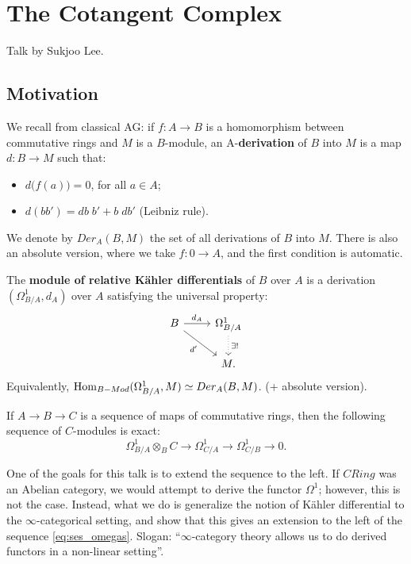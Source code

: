 \chapter{The Cotangent Complex}
Talk by Sukjoo Lee.

\section{Motivation}
\label{sect:cc_motivation}

We recall from classical AG: if $f:A \to B$ is a homomorphism between commutative rings and $M$ is a $B$-module, 
an A-\textbf{derivation} of $B$ into $M$ is a map $d : B \to M$ such that:
\begin{itemize}
\item $d\big( f(a)\big) = 0$, for all $a\in A$;
\item $d(bb') = db\; b' + b\; db'$ (Leibniz rule).
\end{itemize}
We denote by $Der_A(B,M)$ the set of all derivations of $B$ into $M$. There is also an absolute version, where
we take $f:0 \to A$, and the first condition is automatic.

\begin{defin}
The \textbf{module of relative K\"ahler differentials} of $B$ over $A$ is a derivation $(\Omega^{1}_{B/A}, d_A)$ 
over $A$ satisfying the universal property:
\[
\begin{tikzcd}
B \arrow{r}{d_A}\arrow[swap]{rd}{d'} & \Omega^1_{B/A}\arrow[dotted]{d}{\exists !} \\
 & M.
\end{tikzcd}
\]
Equivalently, $\operatorname{Hom}_{B-Mod}(\Omega^1_{B/A}, M) \simeq Der_A(B,M)$. (+ absolute version).
\end{defin}

\begin{prop}
If $A \to B \to C$ is a sequence of maps of commutative rings, then the following sequence of $C$-modules is exact:
\begin{equation}
\label{eq:ses_omegas}
	\Omega^1_{B/A} \otimes_B C \to \Omega^1_{C/A} \to \Omega^1_{C/B} \to 0.
\end{equation}
\end{prop}

One of the goals for this talk is to extend the sequence to the left. If $CRing$ was an Abelian category, we would
attempt to derive the functor $\Omega^1$; however, this is not the case. Instead, what we do is generalize the notion of
K\"ahler differential to the $\infty$-categorical setting, and show that this gives an extension to the left of the sequence
\ref{eq:ses_omegas}. Slogan: ``$\infty$-category theory allows us to do derived functors in a non-linear setting''. 



